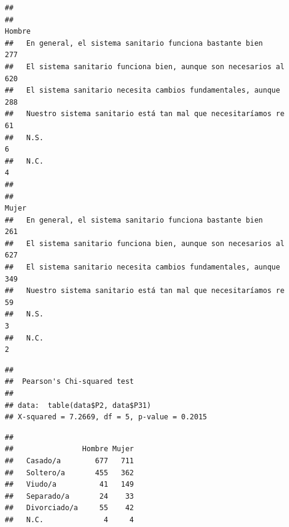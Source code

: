 \documentclass[
]{book}
\newenvironment{Shaded}{\begin{snugshade}}{\end{snugshade}}
\newcommand{\FunctionTok}[1]{\textcolor[rgb]{0.00,0.00,0.00}{#1}}
\newcommand{\NormalTok}[1]{#1}
\newcommand{\SpecialCharTok}[1]{\textcolor[rgb]{0.00,0.00,0.00}{#1}}
\begin{document}
\begin{verbatim}
##                                                               
##                                                                Hombre
##   En general, el sistema sanitario funciona bastante bien         277
##   El sistema sanitario funciona bien, aunque son necesarios al    620
##   El sistema sanitario necesita cambios fundamentales, aunque     288
##   Nuestro sistema sanitario está tan mal que necesitaríamos re     61
##   N.S.                                                              6
##   N.C.                                                              4
##                                                               
##                                                                Mujer
##   En general, el sistema sanitario funciona bastante bien        261
##   El sistema sanitario funciona bien, aunque son necesarios al   627
##   El sistema sanitario necesita cambios fundamentales, aunque    349
##   Nuestro sistema sanitario está tan mal que necesitaríamos re    59
##   N.S.                                                             3
##   N.C.                                                             2
\end{verbatim}

\begin{Shaded}
\end{Shaded}

\begin{verbatim}
## 
##  Pearson's Chi-squared test
## 
## data:  table(data$P2, data$P31)
## X-squared = 7.2669, df = 5, p-value = 0.2015
\end{verbatim}

\begin{Shaded}
\end{Shaded}

\begin{verbatim}
##               
##                Hombre Mujer
##   Casado/a        677   711
##   Soltero/a       455   362
##   Viudo/a          41   149
##   Separado/a       24    33
##   Divorciado/a     55    42
##   N.C.              4     4
\end{verbatim}
\end{document}
